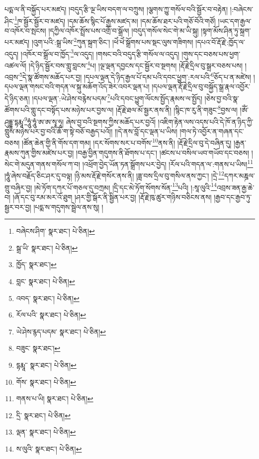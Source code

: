 པདྨ་ལ་ནི་བསྐྱོད་པར་མཛད། །བདུད་རྩི་ལྔ་ཡིས་བདག་ལ་བཀྲུས། །ལྕགས་ཀྱུ་གསོལ་བའི་སྦྱོར་བ་བརྟེན། །:བཞེངས་ཤིང་\footnote{བཞེངས་ཤིག་  སྣར་ཐང་།  པེ་ཅིན། }ཁ་སྦྱོར་སྦྱོར་བ་མཛད། །དམ་ཆོས་སྙིང་པོ་རྒྱས་མཛད་མ། །དམ་ཆོས་ཐར་པའི་གཅོ་བོའི་གཙོ། །ཡང་དག་རྒྱལ་བ་འཁོར་བ་སྤངས། །དཀྱིལ་འཁོར་སྤྲོས་པས་འགྲོ་བ་སྒྲོལ། །བདུད་གསོལ་སེང་གེ་མ་ཡི་སྐུ། །སྟག་མོས་ཤིན་ཏུ་སྐྲག་པར་མཛད། །འུག་པའི་:སྒྲ་ཡིས་\footnote{སྒྲ་ཡི་  སྣར་ཐང་།  པེ་ཅིན། }ཀུན་སྐྲག་ཅིང་། །ཕེཾ་ཕེཾ་སྒྲོགས་པས་སྡང་ལུས་གཟིགས། །དཔའ་བོ་རྡོ་རྗེ་:ཁྱོད་ལ་འདུད། །འཁོར་བ་སྒྲོལ་བ་ཁྱོད་\footnote{ཁྱོད་  སྣར་ཐང་། }ལ་འདུད། །གསང་བའི་བདུད་རྩི་གསོལ་ལ་འདུད། །གུས་དང་བཅས་པས་ཕྱག་འཚལ་ལོ། །དེ་ཉིད་སྦྱོར་བས་གླུ་བླངས་\footnote{བླང་  སྣར་ཐང་།  པེ་ཅིན། }པ། །ལྔ་ལྡན་དབྱངས་དང་སྦྱོར་བ་སྔགས། །རྡོ་རྗེ་དྲིལ་བུ་སྒྲར་བཅས་པས། །འབྲས་\footnote{འབད་  སྣར་ཐང་།  པེ་ཅིན། }དེ་སྣ་ཚོགས་མཆོད་པར་བྱ། །དཔལ་ལྡན་དེ་ཉིད་རྒྱལ་པོ་དམ་པའི་དབང་ཕྱུག་:རལ་པའི་\footnote{རོལ་པའི་  སྣར་ཐང་།  པེ་ཅིན། }ཅོད་པ་ན་མཛེས། །དཔལ་ལྡན་གསང་བའི་གདན་ལ་སྐུ་མཆོག་འོད་ཟེར་འབར་ལྡན་པ། །དཔལ་ལྡན་རྡོ་རྗེ་དྲིལ་བུ་བསྐྱོད་སྒྲ་རྣལ་འབྱོར་དེ་ཉིད་ཅན། །དཔལ་ལྡན་:ཡེ་ཤེས་བརྙེས་པདམ་\footnote{ཡེ་ཤེས་རྙད་པདམ་  སྣར་ཐང་།  པེ་ཅིན། }པའི་དབང་ཕྱུག་ལོངས་སྤྱོད་རྣམས་ལ་སྤྱོད། །ཅེས་བྱ་བའི་སྣ་ཚོགས་པའི་གླུ་དང་བསྟོད་པས་མཉེས་པར་བྱས་ལ། །རྡོ་རྗེ་ཐལ་མོ་སྦྱར་ནས་ནི། །སྙིང་ཁ་རུ་ནི་གཟུང་\footnote{བཟུང་  སྣར་ཐང་། }བྱས་ལ། །ཨོཾ་ཤུདྡྷ་དྷརྨཱ་\footnote{དྷརྨཱ་་  སྣར་ཐང་།  པེ་ཅིན། }ཧཱུཾ་ཧཱུཾ་ཨ་ཨ་སྭཱ་ཧཱ། ཞེས་བྱ་བའི་སྔགས་ཀྱིས་མཆོད་པར་བྱའོ། །འཇིག་རྟེན་ལས་འདས་པའི་དེ་ཁོ་ན་ཉིད་ཀྱི་གླུས་མཉེས་པར་བྱ་བའི་ཆོ་ག་སྟེ་བཅོ་བརྒྱད་པའོ།། །།དེ་ནས་བློ་དང་ལྡན་པ་ཡིས། །གལ་ཏེ་འབྱོར་ན་གཞན་དང་བཅས། །ཚོན་ཆེན་གྱི་ནི་གོས་དག་གམ། །དར་སོགས་སར་པ་བགོས་\footnote{གོས་  སྣར་ཐང་།  པེ་ཅིན། }ནས་ནི། །རྡོ་རྗེ་དྲིལ་བུ་དེ་བཞིན་དུ། །རྒྱན་རྣམས་ཀུན་གྱིས་མཛེས་པར་བྱ། །བརྒྱ་བྱིན་གདུགས་ནི་ཐོགས་པ་དང་། །ཚངས་པ་བསིལ་ཡབ་གཡོབ་དང་བཅས། །སེང་གེ་མདུན་གནས་གསོལ་ཀ་བ། །འཕྲོག་བྱེད་ཡོན་ཏན་སྒྲོགས་པར་བྱེད། །རོལ་པའི་གདན་ལ་:གནས་པ་ཡིས།\footnote{གནས་པ་ཡི།  སྣར་ཐང་།  པེ་ཅིན། } །ཧཱུཾ་ཞེས་བརྗོད་ཅིང་ཤར་དུ་བལྟ། །ཉི་མས་རྡོ་རྗེ་གསོར་ནས་ནི། །ཟླ་བས་དྲིལ་བུ་གསིལ་ནས་ཀྱང་། །དྲེ་\footnote{དྲི་  སྣར་ཐང་།  པེ་ཅིན། }དཀར་མཎྜལ་གྲུ་བཞིར་བྱ། །མེ་ཏོག་དཀར་པོ་གཅལ་དུ་བཀྲམ། །དྲི་དང་མེ་ཏོག་སོགས་སོན་\footnote{ལྡན་  སྣར་ཐང་།  པེ་ཅིན། }པའི། །:སཱ་ལུའི་\footnote{ས་ལུའི་  སྣར་ཐང་།  པེ་ཅིན། }འབྲས་ཟན་རྒྱ་ཆེ་བ། །ཞོ་དང་བུ་རམ་མར་འོ་ཐུག །ཤར་གྱི་སྒོར་ནི་སྦྱིན་པར་བྱ། །རྡོ་རྗེ་ཁུ་ཚུར་གཉིས་བཅིངས་ནས། །རྒྱབ་དང་རྒྱབ་ཏུ་སྦྱར་བར་བྱ། །པདྨ་ས་གདུགས་སྦྲེལ་ནས་སུ། །
